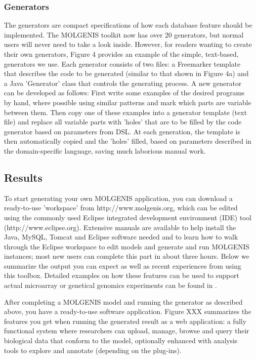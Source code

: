 \subsubsection{Generators}
The generators are compact specifications of how each database feature should be implemented. 
The MOLGENIS toolkit now has over 20 generators, but normal users will never need to take a look 
inside. However, for readers wanting to create their own generators, Figure 4 provides an example 
of the simple, text-based, generators we use. Each generator consists of two files: a Freemarker 
template that describes the code to be generated (similar to that shown in Figure 4a) and a Java 
'Generator' class that controls the generating process. A new generator can be developed as 
follows: First write some examples of the desired programs by hand, where possible using similar 
patterns and mark which parts are variable between them. Then copy one of these examples into 
a generator template (text file) and replace all variable parts with 'holes' that 
are to be filled by the code generator based on parameters from DSL. At each generation, the 
template is then automatically copied and the 'holes' filled, based on parameters described in 
the domain-specific language, saving much laborious manual work. 

\subsection{Results}
To start generating your own MOLGENIS application, you can download a ready-to-use 'workspace' 
from http://www.molgenis.org, which can be edited using the commonly used Eclipse integrated 
development environment (IDE) tool (http://www.eclipse.org). Extensive manuals are available to 
help install the Java, MySQL, Tomcat and Eclipse software needed and to learn how to walk through 
the Eclipse workspace to edit models and generate and run MOLGENIS instances; most new users can 
complete this part in about three hours. Below we summarize the output you can expect as well 
as recent experiences from using this toolbox. Detailed examples on how these features can be 
used to support actual microarray or genetical genomics experiments can be found in \cite{Swertz:2010a, Li:2009, Smedley:2008}.

After completing a MOLGENIS model and running the generator as described above, you have a 
ready-to-use software application. Figure XXX summarizes the features you get when running the 
generated result as a web application: a fully functional system where researchers can upload, 
manage, browse and query their biological data that conform to the model, optionally enhanced 
with analysis tools to explore and annotate (depending on the plug-ins).

